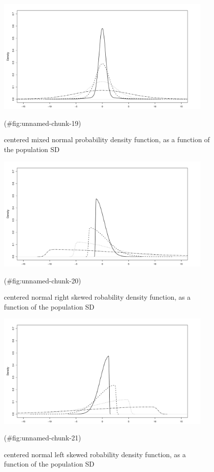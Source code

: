 \begin{appendix}
\begin{figure}
\includegraphics[width=400px]{W-test_files/figure-latex/unnamed-chunk-19-1} \caption{centered mixed normal probability density function, as a function of the population SD}(\#fig:unnamed-chunk-19)
\end{figure}

\begin{figure}
\includegraphics[width=400px]{W-test_files/figure-latex/unnamed-chunk-20-1} \caption{centered normal right skewed robability density function, as a function of the population SD}(\#fig:unnamed-chunk-20)
\end{figure}

\begin{figure}
\includegraphics[width=400px]{W-test_files/figure-latex/unnamed-chunk-21-1} \caption{centered normal left skewed robability density function, as a function of the population SD}(\#fig:unnamed-chunk-21)
\end{figure}


\end{appendix}
